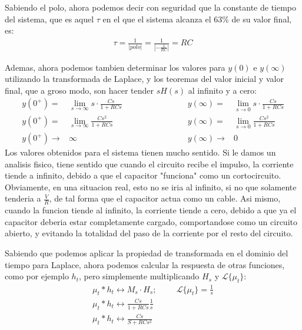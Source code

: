 \documentclass[12pt,a4paper]{report}
\begin{document}
\begin{enumerate}[label=\alph*)]
      Sabiendo el polo, ahora podemos decir con seguridad que la constante de tiempo del sistema, que es aquel $\tau$ 
      en el que el sistema alcanza el 63\% de su valor final, es:
      \begin{gather*}
        \tau = \frac{1}{|polo|} = \frac{1}{|-\frac{1}{RC}|} = RC
      \end{gather*}

      Ademas, ahora podemos tambien determinar los valores para $y(0)$ e $y(\infty)$ utilizando la transformada de
      Laplace, y los teoremas del valor inicial y valor final, que a groso modo, son hacer tender $sH(s)$ al
      infinito y a cero:
      \begin{align*}
        y(0^+) =& \lim_{s\to\infty} s \cdot \frac{Cs}{1+RCs} \hspace{3cm} &y(\infty) =& \lim_{s\to0} s \cdot
          \frac{Cs}{1+RCs}\\[6pt]
        y(0^+) =& \lim_{s\to\infty} \frac{Cs^2}{1+RCs} \hspace{3cm} &y(\infty) =& \lim_{s\to0} \frac{Cs^2}{1+RCs}\\[6pt]
        y(0^+) \to& \infty \hspace{3cm} &y(\infty) \to& 0
      \end{align*}
      Los valores obtenidos para el sistema tienen mucho sentido. Si le damos un analisis fisico, tiene sentido que
      cuando el circuito recibe el impulso, la corriente tiende a infinito, debido a que el capacitor "funciona" como
      un cortocircuito. Obviamente, en una situacion real, esto no se iria al infinito, si no que solamente tenderia a
      $\frac{V}{R}$, de tal forma que el capacitor actua como un cable.
      Asi mismo, cuando la funcion tiende al infinito, la corriente tiende a cero, debido a que ya el capacitor deberia
      estar completamente cargado, comportandose como un circuito abierto, y evitando la totalidad del paso de la
      corriente por el resto del circuito.

      Sabiendo que podemos aplicar la propiedad de transformada en el dominio del tiempo para Laplace, ahora podemos
      calcular la respuesta de otras funciones, como por ejemplo $h_t$, pero simplemente multiplicando $H_s$ y
      $\mathcal{L}\{\mu_t\}$:
      \begin{gather*}
        \mu_t * h_t \longleftrightarrow M_s \cdot H_s; \hspace{1cm}\mathcal{L}\{\mu_t\} = \frac{1}{s}\\[6pt]
        \mu_t * h_t \longleftrightarrow \frac{Cs}{1+RCs} \frac{1}{s}\\[6pt]
        \mu_t * h_t \longleftrightarrow \frac{Cs}{S+RCs^2}
      \end{gather*}


  \end{enumerate}
\end{document}
